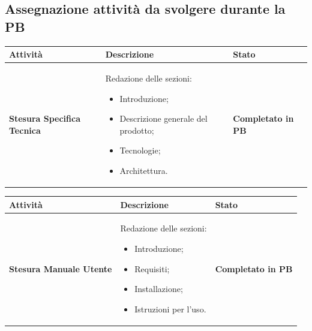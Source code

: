 \documentclass[a4paper,12pt]{article}
\begin{document}
	\subsection{Assegnazione attività da svolgere durante la PB}
    {\renewcommand{\arraystretch}{1.4}
            \begin{table}[H]
            \centering
            \begin{tabularx}{\textwidth}{|X|X|X|}
                \hline
                \rowcolor{gold}
		    \textbf{Attività} & \textbf{Descrizione} & \textbf{Stato}\\
                \hline
		      \textbf{Stesura Specifica Tecnica} & Redazione delle sezioni:
		    \begin{itemize}
			    \item Introduzione;
			    \item Descrizione generale del prodotto;
                \item Tecnologie; 
                \item Architettura.
		    \end{itemize}		    & \textbf{Completato in PB} \\
                \hline
              \end{tabularx}      
            \end{table}
        }

        {\renewcommand{\arraystretch}{1.4}
            \begin{table}[H]
            \centering
            \begin{tabularx}{\textwidth}{|X|X|X|}
                \hline
                \rowcolor{gold}
		    \textbf{Attività} & \textbf{Descrizione} & \textbf{Stato}\\
                \hline
		      \textbf{Stesura Manuale Utente} & Redazione delle sezioni:
		    \begin{itemize}
			    \item Introduzione;
			    \item Requisiti;
                \item Installazione;
                \item Istruzioni per l'uso.
		    \end{itemize}		    & \textbf{Completato in PB} \\
                \hline
              \end{tabularx}      
            \end{table}
        }
\end{document}
